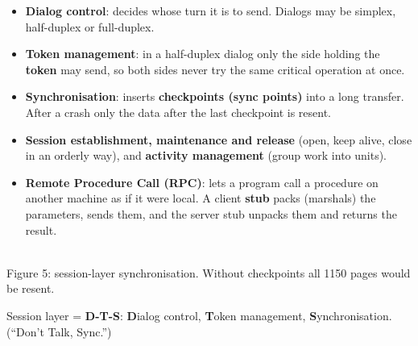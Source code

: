 \documentclass[10pt]{article}
\newcommand{\figcap}[1]{\\[1pt]{\scriptsize\color{midgrey}#1}}
\begin{document}
\begin{itemize}
\item \textbf{Dialog control}: decides whose turn it is to send. Dialogs may be simplex, half-duplex or full-duplex.
\item \textbf{Token management}: in a half-duplex dialog only the side holding the \textbf{token} may send, so both sides never try the same critical operation at once.
\item \textbf{Synchronisation}: inserts \textbf{checkpoints (sync points)} into a long transfer. After a crash only the data after the last checkpoint is resent.
\item \textbf{Session establishment, maintenance and release} (open, keep alive, close in an orderly way), and \textbf{activity management} (group work into units).
\item \textbf{Remote Procedure Call (RPC)}: lets a program call a procedure on another machine as if it were local. A client \textbf{stub} packs (marshals) the parameters, sends them, and the server stub unpacks them and returns the result.
\end{itemize}

\begin{center}
\figcap{Figure 5: session-layer synchronisation. Without checkpoints all 1150 pages would be resent.}
\end{center}

\begin{mnemonic}
Session layer = \textbf{D-T-S}: \textbf{D}ialog control, \textbf{T}oken management, \textbf{S}ynchronisation. (``Don't Talk, Sync.'')
\end{mnemonic}
\end{document}
